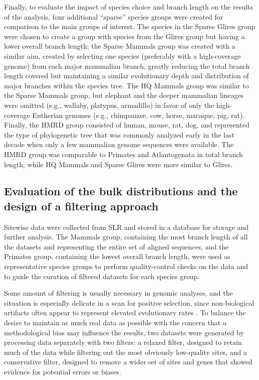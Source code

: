 Finally, to evaluate the impact of species choice and branch length on
the results of the \sw analysis, four additional ``sparse'' species
groups were created for comparison to the main groups of interest. The
species in the Sparse Glires group were chosen to create a group with
species from the Glires group but having a lower overall branch
length; the Sparse Mammals group was created with a similar aim,
created by selecting one species (preferably with a high-coverage
genome) from each major mammalian branch, greatly reducing the total
branch length covered but maintaining a similar evolutionary depth and
distribution of major branches within the species tree. The HQ Mammals
group was similar to the Sparse Mammals group, but elephant and the
deeper mammalian lineages were omitted (e.g., wallaby, platypus,
armadillo) in favor of only the high-coverage Eutherian genomes (e.g.,
chimpanzee, cow, horse, macaque, pig, rat). Finally, the HMRD group
consisted of human, mouse, rat, dog, and represented the type of
phylogenetic tree that was commonly analyzed early in the last decade
when only a few mammalian genome sequences were available. The HMRD
group was comparable to Primates and Atlantogenata in total branch
length, while HQ Mammals and Sparse Glires were more similar to
Glires.

\subsection{Evaluation of the bulk distributions and the design of a filtering approach}
\label{section_sitewise_filtering}

Sitewise data were collected from SLR and stored in a database for
storage and further analysis. The Mammals group, containing the most
branch length of all the datasets and representing the entire set of
aligned sequences, and the Primates group, containing the lowest
overall branch length, were used as representative species groups to
perform quality-control checks on the \sw data and to guide the
curation of filtered \sw datasets for each species group.

Some amount of filtering is usually necessary in genomic analyses, and
the situation is especially delicate in a scan for positive selection,
since non-biological artifacts often appear to represent elevated
evolutionary rates
\citep{MarkovaRaina2011,Schneider2009,Mallick2009}. To balance the
desire to maintain as much real data as possible with the concern that
a methodological bias may influence the results, two datasets were
generated by processing \sw data separately with two filters: a
relaxed filter, designed to retain much of the data while filtering
out the most obviously low-quality sites, and a conservative filter,
designed to remove a wider set of sites and genes that showed evidence
for potential errors or biases.

